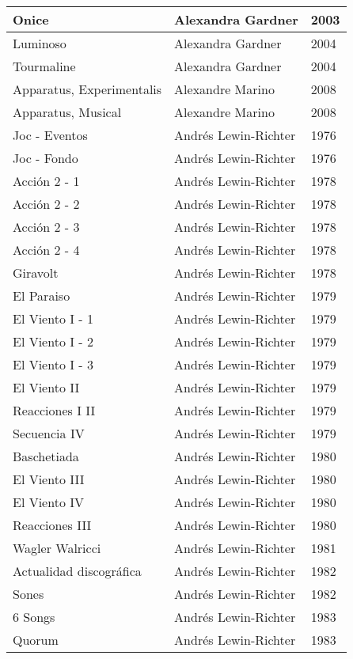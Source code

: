 \begin{center}
\begin{longtable}{| p{} | p{} | p{} |}
Onice & Alexandra Gardner & 2003 \\ \hline 
Luminoso & Alexandra Gardner & 2004 \\ \hline 
Tourmaline & Alexandra Gardner & 2004 \\ \hline 
Apparatus, Experimentalis & Alexandre Marino & 2008 \\ \hline 
Apparatus, Musical & Alexandre Marino & 2008 \\ \hline 
Joc - Eventos & Andrés Lewin-Richter & 1976 \\ \hline 
Joc - Fondo & Andrés Lewin-Richter & 1976 \\ \hline 
Acción 2 - 1 & Andrés Lewin-Richter & 1978 \\ \hline 
Acción 2 - 2 & Andrés Lewin-Richter & 1978 \\ \hline 
Acción 2 - 3 & Andrés Lewin-Richter & 1978 \\ \hline 
Acción 2 - 4 & Andrés Lewin-Richter & 1978 \\ \hline 
Giravolt & Andrés Lewin-Richter & 1978 \\ \hline 
El Paraiso & Andrés Lewin-Richter & 1979 \\ \hline 
El Viento I - 1 & Andrés Lewin-Richter & 1979 \\ \hline 
El Viento I - 2 & Andrés Lewin-Richter & 1979 \\ \hline 
El Viento I - 3 & Andrés Lewin-Richter & 1979 \\ \hline 
El Viento II & Andrés Lewin-Richter & 1979 \\ \hline 
Reacciones I II & Andrés Lewin-Richter & 1979 \\ \hline 
Secuencia IV & Andrés Lewin-Richter & 1979 \\ \hline 
Baschetiada & Andrés Lewin-Richter & 1980 \\ \hline 
El Viento III & Andrés Lewin-Richter & 1980 \\ \hline 
El Viento IV & Andrés Lewin-Richter & 1980 \\ \hline 
Reacciones III & Andrés Lewin-Richter & 1980 \\ \hline 
Wagler Walricci & Andrés Lewin-Richter & 1981 \\ \hline 
Actualidad discográfica & Andrés Lewin-Richter & 1982 \\ \hline 
Sones & Andrés Lewin-Richter & 1982 \\ \hline 
6 Songs & Andrés Lewin-Richter & 1983 \\ \hline 
Quorum & Andrés Lewin-Richter & 1983 \\ \hline 

\end{longtable}
\end{center}
